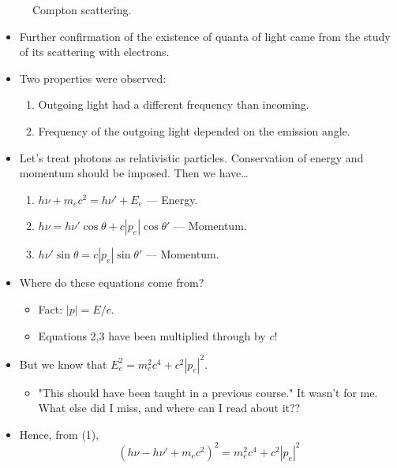 \documentclass[../notes.tex]{subfiles}
\begin{document}
\begin{itemize}
\begin{figure}[H]
        \caption{Compton scattering.}
        \label{fig:comptonScattering}
    \end{figure}
    \begin{itemize}
        \item Further confirmation of the existence of quanta of light came from the study of its scattering with electrons.
        \item Two properties were observed:
        \begin{enumerate}
            \item Outgoing light had a different frequency than incoming.
            \item Frequency of the outgoing light depended on the emission angle.
        \end{enumerate}
        \item Let's treat photons as relativistic particles. Conservation of energy and momentum should be imposed. Then we have\dots
        \begin{enumerate}
            \item $h\nu+m_ec^2=h\nu'+E_e$ --- Energy.
            \item $h\nu=h\nu'\cos\theta+c|p_e|\cos\theta'$ --- Momentum.
            \item $h\nu'\sin\theta=c|p_e|\sin\theta'$ --- Momentum.
        \end{enumerate}
        \item Where do these equations come from?
        \begin{itemize}
            \item Fact: $|p|=E/c$.
            \item Equations 2,3 have been multiplied through by $c$!
        \end{itemize}
        \item But we know that $E_e^2=m_e^2c^4+c^2|p_e|^2$.
        \begin{itemize}
            \item "This should have been taught in a previous course." It wasn't for me. What else did I miss, and where can I read about it??
        \end{itemize}
        \item Hence, from (1),
        \begin{equation*}
            (h\nu-h\nu'+m_ec^2)^2 = m_e^2c^4+c^2|p_e|^2

\end{equation*}
\end{itemize}
\end{itemize}
\end{document}
